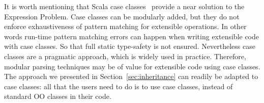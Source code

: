 It is worth mentioning that Scala case classes~\cite{emir2007matching} provide a near
solution to the Expression Problem. Case classes can be
modularly added, but they do not enforce
exhaustiveness of pattern matching for extensible operations. In other
words run-time pattern matching errors can happen when writing extensible code with case classes. So that full static type-safety is not ensured. Nevertheless case classes are a pragmatic approach, which is
widely used in practice. Therefore, modular parsing techniques may be
of value for extensible code using case classes.  The approach we
presented in Section~\ref{sec:inheritance} can readily be adapted to case classes:
all that the users need to do is to use case classes, instead of
standard OO classes in their code.

\begin{comment}
Moreover, in~\cite{Oliveira:2012} the authors have discussed the
composition of algebras. In our parsing approach, a parser consumes an
algebra, which is delegated to return the results, during its process
of parsing. Having a set of algebras, it requires multiple parsing
with several times of invocation, which leads to redundant work.
Instead, algebras are supposed to be composed into one before the
invocation of the parser. Bahr et al. lead a similar discussion
in~\cite{Bahr2011}, where queries (or \textit{catamorphisms}) and
transformations (or \textit{homomorphisms}) are composable. They have
also mentioned the dual process of folds, namely
\textit{anamorphisms}. It is potentially related to our work, as
parsing is a representative kind of unfolds, whereas they only
discussed the composition of a cv-coalgebra and a term homomorphism,
which differs from modular parsing.
\end{comment}

